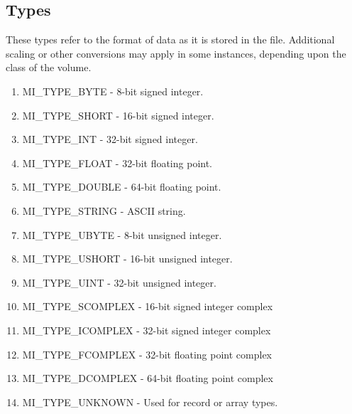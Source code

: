 \documentclass{article}
\begin{document}
\subsection{Types}
These types refer to the format of data as it is stored in the file.
Additional scaling or other conversions may apply in some instances, 
depending upon the class of the volume.
\begin{enumerate}
\item MI\_TYPE\_BYTE - 8-bit signed integer.
\item MI\_TYPE\_SHORT - 16-bit signed integer.
\item MI\_TYPE\_INT - 32-bit signed integer.
\item MI\_TYPE\_FLOAT - 32-bit floating point.
\item MI\_TYPE\_DOUBLE - 64-bit floating point.
\item MI\_TYPE\_STRING - ASCII string.
\item MI\_TYPE\_UBYTE - 8-bit unsigned integer.
\item MI\_TYPE\_USHORT - 16-bit unsigned integer.
\item MI\_TYPE\_UINT - 32-bit unsigned integer.
\item MI\_TYPE\_SCOMPLEX - 16-bit signed integer complex
\item MI\_TYPE\_ICOMPLEX - 32-bit signed integer complex
\item MI\_TYPE\_FCOMPLEX - 32-bit floating point complex
\item MI\_TYPE\_DCOMPLEX - 64-bit floating point complex
\item MI\_TYPE\_UNKNOWN - Used for record or array types.
\end{enumerate}
\end{document}
